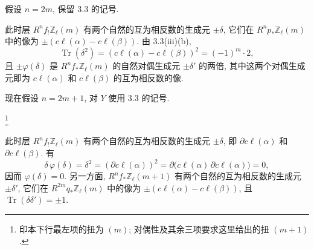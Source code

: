假设 $n=2m$, 保留 3.3 的记号.


\begin{center}
\end{center}

此时层 $R^nf_!\mathbb Z_\ell(m)$ 有两个自然的互为相反数的生成元 $\pm\delta$, 它们在 $R^np_*\mathbb Z_\ell(m)$ 中的像为 $\pm(c\ell(\alpha)-c\ell(\beta))$. 由 3.3(iii)(b),
\begin{equation*}
\operatorname{Tr}(\delta^2)
=(c\ell(\alpha)-c\ell(\beta))^2=(-1)^m\cdot2,
\end{equation*}
且 $\pm\varphi(\delta)$ 是 $R^nf_*\mathbb Z_\ell(m)$ 的自然对偶生成元 $\pm\delta'$ 的两倍, 其中这两个对偶生成元即为 $c\ell(\alpha)$ 和 $c\ell(\beta)$ 的互为相反数的像.

现在假设 $n=2m+1$, 对 $Y$ 使用 3.3 的记号.

\begin{center}
\end{center}

\footnote{印本下行最左项的扭为 $(m)$; 对偶性及其余三项要求这里给出的扭 $(m+1)$.}

此时层 $R^nf_!\mathbb Z_\ell(m)$ 有两个自然的互为相反数的生成元 $\pm\delta$, 即 $\partial c\ell(\alpha)$ 和 $\partial c\ell(\beta)$. 有
\begin{equation*}
\delta\,\varphi(\delta)=\delta^2
=(\partial c\ell(\alpha))^2
=\partial\bigl(c\ell(\alpha)\,\partial c\ell(\alpha)\bigr)=0,
\end{equation*}
因而 $\varphi(\delta)=0$. 另一方面, $R^nf_*\mathbb Z_\ell(m+1)$ 有两个自然的互为相反数的生成元 $\pm\delta'$, 它们在 $R^{2m}q_*\mathbb Z_\ell(m)$ 中的像为 $\pm(c\ell(\alpha)-c\ell(\beta))$, 且 $\operatorname{Tr}(\delta\delta')=\pm1$.

